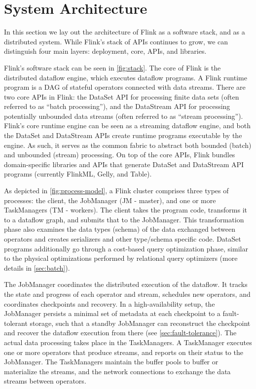 
\section{System Architecture}
\label{sec:architecture}

In this section we lay out the architecture of Flink as a software stack, and as a distributed system. While Flink's stack of APIs continues to grow, we can distinguish four main layers: deployment, core, APIs, and libraries.

 Flink's software stack can be seen in \autoref{fig:stack}. The core of Flink is the distributed dataflow engine, which executes dataflow programs. A Flink runtime program is a DAG of stateful operators connected with data streams. There are two core APIs in Flink: the DataSet API for processing finite data sets (often referred to as “batch processing”), and the DataStream API for processing potentially unbounded data streams (often referred to as “stream processing”). Flink’s core runtime engine can be seen as a streaming dataflow engine, and both the DataSet and DataStream APIs create runtime programs executable by the engine. As such, it serves as the common fabric to abstract both bounded (batch) and unbounded (stream) processing. On top of the core APIs, Flink bundles domain-specific libraries and APIs that generate DataSet and DataStream API programs (currently FlinkML, Gelly, and Table). 

As depicted in \autoref{fig:process-model}, a Flink cluster comprises three types of processes: the client, the JobManager (JM - master), and one or more TaskManagers (TM - workers). The client takes the program code, transforms it to a dataflow graph, and submits that to the JobManager. This transformation phase also examines the data types (schema) of the data exchanged between operators and creates serializers and other type/schema specific code. DataSet programs additionally go through a cost-based query optimization phase, similar to the physical optimizations performed by relational query optimizers (more details in \autoref{sec:batch}).

The JobManager coordinates the distributed execution of the dataflow. It tracks the state and progress of each operator and stream, schedules new operators, and coordinates checkpoints and recovery. In a high-availability setup, the JobManager persists a minimal set of metadata at each checkpoint to a fault-tolerant storage, such that a standby JobManager can reconstruct the checkpoint and recover the dataflow execution from there (see \autoref{sec:fault-tolerance}). The actual data processing takes place in the TaskManagers. A TaskManager executes one or more operators that produce streams, and reports on their status to the JobManager. The TaskManagers maintain the buffer pools to buffer or materialize the streams, and the network connections to exchange the data streams between operators.


